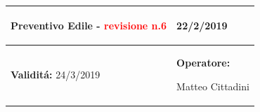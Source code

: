 \documentclass[a4paper]{article}
\begin{document}
                                  \begin{center}
                                  \begin{tabular}{|L{89mm} R{60mm}| }
                                  \hline
                                  \vspace{2.5mm}
                                  \begin{spacing}{0}
                                \textbf{Preventivo Edile - } \textcolor{red}{revisione n.6}
                                  \end{spacing}&
                                  \vspace{2.5mm}
                                  \begin{spacing}{0}

                                22/2/2019

                                  \end{spacing}\\
                                  \hline
                                  \vspace{2.5mm}
                                  \begin{spacing}{0}

                                
                                        \textbf{Validit\'a:}
                                   24/3/2019
                                  \end{spacing} &
                                  \vspace{2.5mm}
                                  \begin{spacing}{0}
                                    \textbf{Operatore:}

                               Matteo Cittadini
                                  \end{spacing} \\
                                  \hline
                                  \end{tabular}
                                  \end{center}
                               
\end{document}
